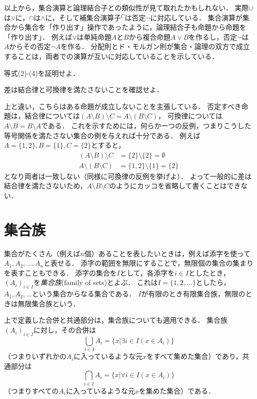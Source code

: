 \documentclass[11pt,a4paper]{jsarticle}
\begin{document}
以上から，集合演算と論理結合子との類似性が見て取れたかもしれない．
実際$\cup$は$\vee$に，$\cap$は$\wedge$に，そして補集合演算子$^C$は否定$\neg$に対応している．
集合演算が集合から集合を「作り出す」操作であったように，論理結合子も命題から命題を「作り出す」．
例えば$\vee$は単純命題$A$と$B$から複合命題$A\vee B$を作るし，否定$\neg$は$A$からその否定$\neg A$を作る．
分配則とド・モルガン則が集合・論理の双方で成立することは，両者での演算が互いに対応していることを示している．

\begin{renshu}{}{}
等式(2)-(4)を証明せよ．
\end{renshu}{}{}

\begin{renshu}{}{}
差は結合律と可換律を満たさないことを確認せよ．
\end{renshu}{}{}

上と違い，こちらはある命題が成立しないことを主張している．
否定すべき命題は，結合律については$(A \setminus B) \setminus C = A \setminus (B \setminus C)$，
可換律については$A \setminus B = B \setminus A$である．
これを示すためには，何らか一つの反例，つまりこうした等号関係を満たさない集合の例を与えれば十分である．
例えば$A = \{1, 2 \}, B = \{1 \}, C = \{2 \}$とすると，
\begin{align*}
(A \setminus B) \setminus C &= \{ 2 \} \setminus \{2 \} = \emptyset \\
A \setminus (B \setminus C) &= \{ 1, 2 \} \setminus \{1 \} = \{ 2 \}
\end{align*}
となり両者は一致しない（同様に可換律の反例を挙げよ）．
よって一般的に差は結合律を満たさないため，$A \setminus B \setminus C$のようにカッコを省略して書くことはできない．




\section{集合族}
集合がたくさん（例えば$n$個）あることを表したいときは，例えば添字を使って$A_1, A_2, \dots, A_n$と表せる．
添字の範囲を無限にすることで，無限個の集合の集まりを表すこともできる．
添字の集合を$I$として，各添字を$i \in I$としたとき，$(A_i)_{i\in I}$を\emph{集合族}(family of sets)とよぶ．
これは$I = \{1, 2,  \dots\}$としたら，$A_1, A_2, \dots$という集合からなる集合である．
$I$が有限のとき有限集合族，無限のときは無限集合族という．

上で定義した合併と共通部分は，集合族についても適用できる．
集合族$(A_i)_{i\in I}$に対し，その合併は
\[
 \bigcup_{i \in I} A_i = \{ x | \exists i \in I (x \in A_i) \}
\]
（つまりいずれかの$A_i$に入っているような元$x$をすべて集めた集合）であり，共通部分は
\[
 \bigcap_{i \in I} A_i = \{ x | \forall i \in I (x \in A_i) \}
\]
（つまりすべての$A_i$に入っているような元$x$を集めた集合）である．
\end{document}
